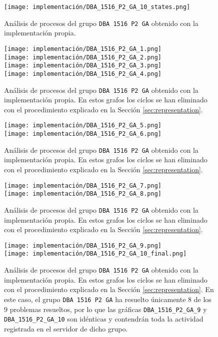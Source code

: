 \begin{figure}[H]
    \centering
    \texttt{[image: implementación/DBA\_1516\_P2\_GA\_10\_states.png]}
    \caption{Análisis de procesos del grupo \texttt{DBA 1516 P2 GA} obtenido con la implementación propia.}
    \label{fig:DBA1516P2GA3}
\end{figure}

\begin{figure}[H]
\centering
\texttt{[image: implementación/DBA\_1516\_P2\_GA\_1.png]} \\
\texttt{[image: implementación/DBA\_1516\_P2\_GA\_2.png]} \\
\texttt{[image: implementación/DBA\_1516\_P2\_GA\_3.png]} \\
\texttt{[image: implementación/DBA\_1516\_P2\_GA\_4.png]}
\caption{Análisis de procesos del grupo \texttt{DBA 1516 P2 GA} obtenido con la implementación propia. En estos grafos los ciclos se han eliminado con el procedimiento explicado en la Sección \ref{sec:representation}.}
\label{fig:DBA1516P2GA4}
\end{figure}

\begin{figure}[H]
\centering
\texttt{[image: implementación/DBA\_1516\_P2\_GA\_5.png]} \\
\texttt{[image: implementación/DBA\_1516\_P2\_GA\_6.png]}
\caption{Análisis de procesos del grupo \texttt{DBA 1516 P2 GA} obtenido con la implementación propia. En estos grafos los ciclos se han eliminado con el procedimiento explicado en la Sección \ref{sec:representation}.}
\label{fig:DBA1516P2GA5}
\end{figure}

\begin{figure}[H]
\centering
\texttt{[image: implementación/DBA\_1516\_P2\_GA\_7.png]} \\
\texttt{[image: implementación/DBA\_1516\_P2\_GA\_8.png]}
\caption{Análisis de procesos del grupo \texttt{DBA 1516 P2 GA} obtenido con la implementación propia. En estos grafos los ciclos se han eliminado con el procedimiento explicado en la Sección \ref{sec:representation}.}
\label{fig:DBA1516P2GA6}
\end{figure}

\begin{figure}[H]
\centering
\texttt{[image: implementación/DBA\_1516\_P2\_GA\_9.png]} \\
\texttt{[image: implementación/DBA\_1516\_P2\_GA\_10\_final.png]}
\caption{Análisis de procesos del grupo \texttt{DBA 1516 P2 GA} obtenido con la implementación propia. En estos grafos los ciclos se han eliminado con el procedimiento explicado en la Sección \ref{sec:representation}. En este caso, el grupo \texttt{DBA 1516 P2 GA} ha resuelto únicamente $8$ de los $9$ problemas resueltos, por lo que las gráficas \texttt{DBA\_1516\_P2\_GA\_9} y \texttt{DBA\_1516\_P2\_GA\_10} son idénticas y contendrán toda la actividad registrada en el servidor de dicho grupo.}
\label{fig:DBA1516P2GA7}
\end{figure}

